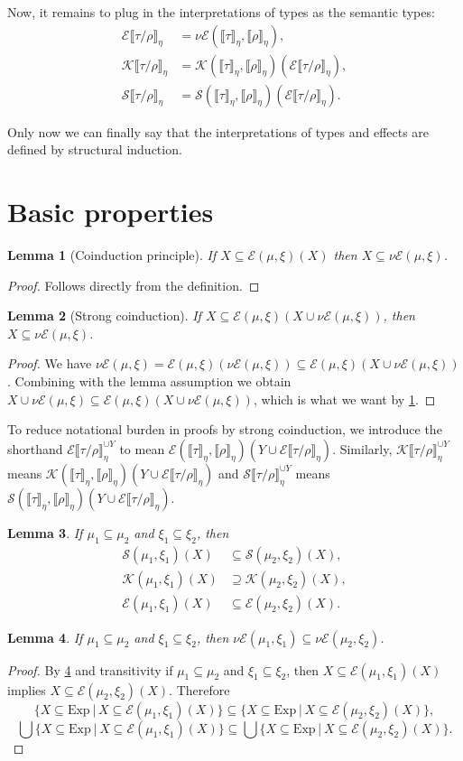 \documentclass[a4paper, 12pt]{report}
\newcommand{\E}{\mathcal{E}}
\newcommand{\K}{\mathcal{K}}
\renewcommand{\S}{\mathcal{S}}
\newcommand{\+}{\enspace}
\newtheorem{lemma}{Lemma}
\begin{document}
Now, it remains to plug in the interpretations of types as the semantic types:
\begin{align*}
\E⟦τ/ρ⟧_η &= ν\E(⟦τ⟧_η,⟦ρ⟧_η), \\
\K⟦τ/ρ⟧_η &= \K(⟦τ⟧_η,⟦ρ⟧_η)(\E⟦τ/ρ⟧_η), \\
\S⟦τ/ρ⟧_η &= \S(⟦τ⟧_η,⟦ρ⟧_η)(\E⟦τ/ρ⟧_η).
\end{align*}

Only now we can finally say that the interpretations of types and effects are defined by structural induction.

\section{Basic properties}
\begin{lemma}[Coinduction principle]\label{coinduction}
If $X ⊆ \E(μ,ξ)(X)$ then $X ⊆ ν\E(μ,ξ)$.
\end{lemma}
\begin{proof}
Follows directly from the definition.
\end{proof}

\begin{lemma}[Strong coinduction]\label{strong-coinduction}
	If $X ⊆ \E(μ,ξ)(X∪ν\E(μ,ξ))$, then $X ⊆ ν\E(μ,ξ)$.
\end{lemma}
\begin{proof}
	We have $ν\E(μ,ξ) = \E(μ,ξ)(ν\E(μ,ξ)) ⊆ \E(μ,ξ)(X∪ν\E(μ,ξ))$.
	Combining with the lemma assumption we obtain
	$X∪ν\E(μ,ξ) ⊆ \E(μ,ξ)(X∪ν\E(μ,ξ))$, which is what we want by \cref{coinduction}.
\end{proof}
To reduce notational burden in proofs by strong coinduction,
we introduce the shorthand
$\E⟦τ/ρ⟧_η^{∪Y}$ to mean $\E(⟦τ⟧_η,⟦ρ⟧_η)(Y∪\E⟦τ/ρ⟧_η)$.
Similarly,
$\K⟦τ/ρ⟧_η^{∪Y}$ means $\K(⟦τ⟧_η,⟦ρ⟧_η)(Y∪\E⟦τ/ρ⟧_η)$ and
$\S⟦τ/ρ⟧_η^{∪Y}$ means $\S(⟦τ⟧_η,⟦ρ⟧_η)(Y∪\E⟦τ/ρ⟧_η)$.

\begin{lemma}
If $μ_1 ⊆ μ_2$ and $ξ_1 ⊆ ξ_2$,
then
\begin{align*}
\S(μ_1,ξ_1)(X) &⊆ \S(μ_2,ξ_2)(X), \\
\K(μ_1,ξ_1)(X) &⊇ \K(μ_2,ξ_2)(X), \\
\E(μ_1,ξ_1)(X) &⊆ \E(μ_2,ξ_2)(X).
\end{align*}
\end{lemma}

\begin{lemma}\label{monotonicity}
If $μ_1 ⊆ μ_2$ and $ξ_1 ⊆ ξ_2$, then $ν\E(μ_1,ξ_1) ⊆ ν\E(μ_2,ξ_2)$.
\end{lemma}
\begin{proof}
By \cref{monotonicity} and transitivity
if $μ_1 ⊆ μ_2$ and $ξ_1 ⊆ ξ_2$, then
$X ⊆ \E(μ_1,ξ_1)(X)$ implies $X ⊆ \E(μ_2,ξ_2)(X)$.
Therefore
$$\{X ⊆ \mathrm{Exp} │ X ⊆ \E(μ_1,ξ_1)(X)\}
⊆\{X ⊆ \mathrm{Exp} │ X ⊆ \E(μ_2,ξ_2)(X)\},$$
$$\bigcup \{X ⊆ \mathrm{Exp} │ X ⊆ \E(μ_1,ξ_1)(X)\}
⊆\bigcup \{X ⊆ \mathrm{Exp} │ X ⊆ \E(μ_2,ξ_2)(X)\}.$$
\end{proof}
\end{document}
